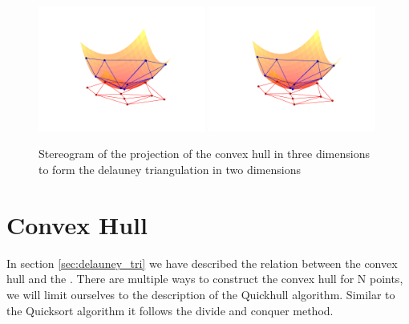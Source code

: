 \begin{figure}[htbp] %
   \centering
   \includegraphics[width=0.49\textwidth]{chapter_ndinterp/plots/delauney_project_left.pdf} 
   \hspace{-1.5cm}
   \includegraphics[width=0.49\textwidth]{chapter_ndinterp/plots/delauney_project_right.pdf} 
   \caption{Stereogram \citep{Vogt11} of the projection of the convex hull in three dimensions to form the delauney triangulation in two dimensions}
   \label{fig:delauney_projection}
\end{figure}

\section{Convex Hull}

In section \ref{sec:delauney_tri} we have described the relation between the convex hull  and the \deltri. There are multiple ways to construct the convex hull for N points, we will limit ourselves to the description of the Quickhull algorithm. Similar to the Quicksort algorithm it follows the divide and conquer method. 



